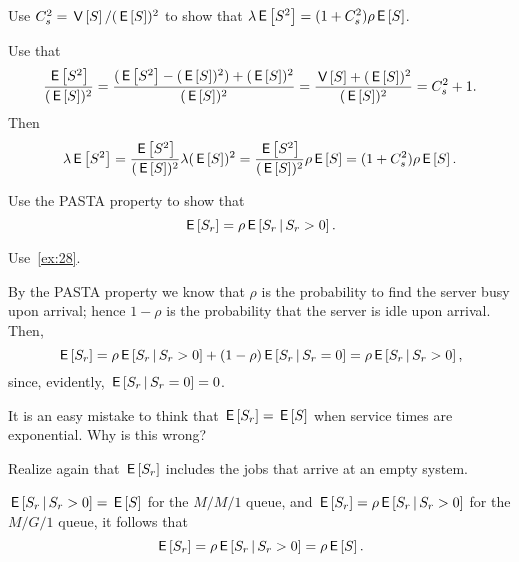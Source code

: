 \begin{extra}
Use $C_s^2 = \V S / (\E S)^2$ to show that $\lambda \E{S^2} = (1+C_s^2)\rho\E S$.
\begin{solution}
Use that 
\begin{equation*}
 \frac{\E{S^2}}{(\E S)^2} = 
 \frac{(\E{S^2}-(\E S)^2) + (\E S)^2}{(\E S)^2} =
 \frac{\V S + (\E S)^2}{(\E S)^2} =
 C_s^2 + 1.
\end{equation*}
Then
\begin{equation*}
 \lambda\E{S^2} = \frac{\E{S^2}}{(\E S)^2} \lambda(\E S)^2=
 \frac{\E{S^2}}{(\E S)^2} \rho \E S = (1+C_s^2) \rho \E{S}.
\end{equation*}
\end{solution}
\end{extra}



\begin{extra}
Use the PASTA property to show that
\begin{equation}\label{eq:37}
\E{S_r} = \rho \E{S_r\given S_r>0}.
\end{equation}
\begin{hint}
 Use~\cref{ex:28}.
\end{hint}
\begin{solution}
By the PASTA property we know that $\rho$ is the probability to find the server busy upon arrival; hence $1- \rho$ is the probability that the server is idle upon arrival. Then,
\begin{equation*}
\E{S_r} = \rho \E{S_r\given S_r >0} + (1-\rho) \E{S_r\given S_r = 0} = \rho \E{S_r\given S_r>0},
\end{equation*}
since, evidently, $\E{S_r\given S_r=0}=0$. 
\end{solution}
\end{extra}

\begin{extra}
 It is an easy mistake to think that $\E{S_r} = \E S$ when service
 times are exponential. Why is this wrong?
\begin{hint}
Realize again that $\E{S_r}$ includes the jobs that arrive at an empty system.
\end{hint}
\begin{solution}

 $\E{S_r \given S_r>0} = \E S$ for the $M/M/1$ queue, and
 $\E{S_r} = \rho \E{S_r \given S_r>0}$ for the $M/G/1$ queue, it
 follows that
 \begin{equation*}
 \E{S_r} = \rho \E{S_r\given S_r>0} = \rho \E S.
 \end{equation*}
\end{solution}
\end{extra}




